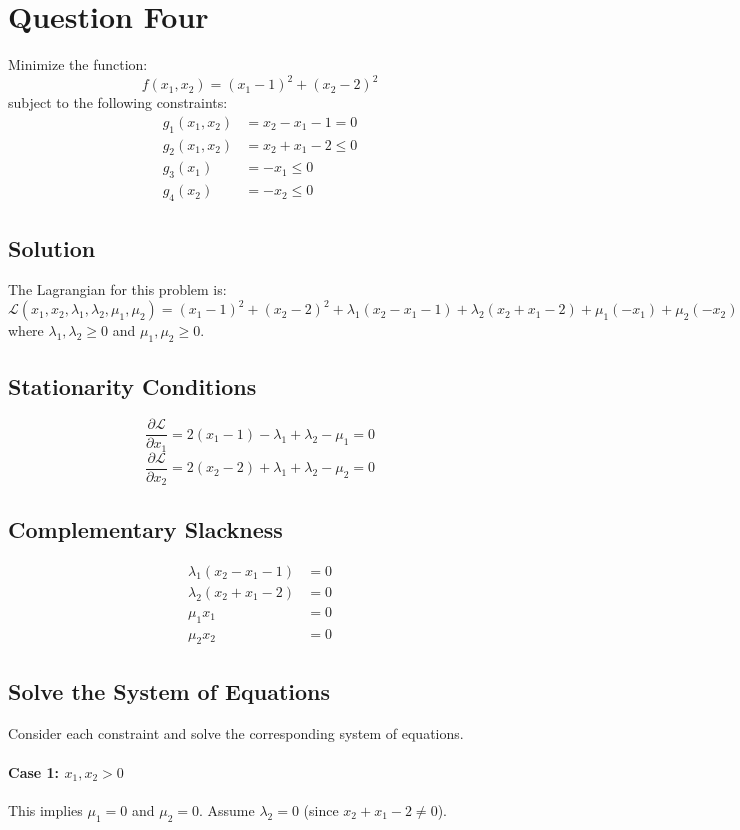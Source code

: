 \documentclass[a4paper, 11pt]{article}
\begin{document}
	\newpage
	\section*{Question Four}
	Minimize the function:
	\[
	f(x_1, x_2) = (x_1 - 1)^2 + (x_2 - 2)^2
	\]
	subject to the following constraints:
	\begin{align*}
		g_1(x_1, x_2) &= x_2 - x_1 - 1 = 0 \\
		g_2(x_1, x_2) &= x_2 + x_1 - 2 \le 0 \\
		g_3(x_1) &= -x_1 \le 0 \\
		g_4(x_2) &= -x_2 \le 0
	\end{align*}
	
	\subsection*{Solution}
	The Lagrangian for this problem is:
	\[
	\mathcal{L}(x_1, x_2, \lambda_1, \lambda_2, \mu_1, \mu_2) = (x_1 - 1)^2 + (x_2 - 2)^2 + \lambda_1 (x_2 - x_1 - 1) + \lambda_2 (x_2 + x_1 - 2) + \mu_1 (-x_1) + \mu_2 (-x_2)
	\]
	where $\lambda_1, \lambda_2 \ge 0$ and $\mu_1, \mu_2 \ge 0$.
	
	\subsection*{Stationarity Conditions}
	\[
	\frac{\partial \mathcal{L}}{\partial x_1} = 2(x_1 - 1) - \lambda_1 + \lambda_2 - \mu_1 = 0
	\]
	\[
	\frac{\partial \mathcal{L}}{\partial x_2} = 2(x_2 - 2) + \lambda_1 + \lambda_2 - \mu_2 = 0
	\]
	
	\subsection*{Complementary Slackness}
	\begin{align*}
		\lambda_1 (x_2 - x_1 - 1) &= 0 \\
		\lambda_2 (x_2 + x_1 - 2) &= 0 \\
		\mu_1 x_1 &= 0 \\
		\mu_2 x_2 &= 0
	\end{align*}
	
	\subsection*{Solve the System of Equations}
	Consider each constraint and solve the corresponding system of equations.
	
	\paragraph{Case 1: $x_1, x_2 > 0$}
	This implies $\mu_1 = 0$ and $\mu_2 = 0$. Assume $\lambda_2 = 0$ (since $x_2 + x_1 - 2 \neq 0$).
	
\end{document}
